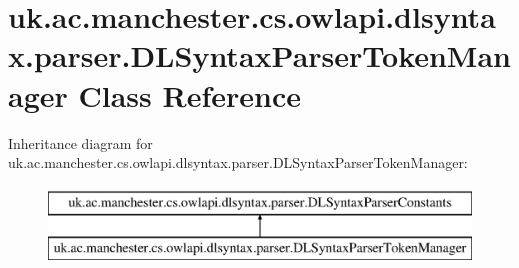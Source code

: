 \hypertarget{classuk_1_1ac_1_1manchester_1_1cs_1_1owlapi_1_1dlsyntax_1_1parser_1_1_d_l_syntax_parser_token_manager}{\section{uk.\-ac.\-manchester.\-cs.\-owlapi.\-dlsyntax.\-parser.\-D\-L\-Syntax\-Parser\-Token\-Manager Class Reference}
\label{classuk_1_1ac_1_1manchester_1_1cs_1_1owlapi_1_1dlsyntax_1_1parser_1_1_d_l_syntax_parser_token_manager}
}
Inheritance diagram for uk.\-ac.\-manchester.\-cs.\-owlapi.\-dlsyntax.\-parser.\-D\-L\-Syntax\-Parser\-Token\-Manager\-:\begin{figure}[H]
\begin{center}
\leavevmode
\includegraphics[height=2.000000cm]{classuk_1_1ac_1_1manchester_1_1cs_1_1owlapi_1_1dlsyntax_1_1parser_1_1_d_l_syntax_parser_token_manager}
\end{center}
\end{figure}
